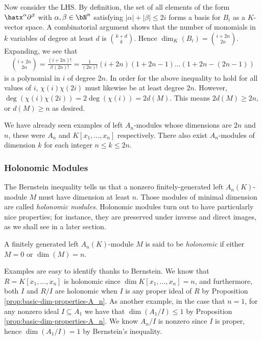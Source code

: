 \begin{prf}
	Now consider the LHS. By definition, the set of all elements of the form $\hatx^\alpha\partial^\beta$ with $\alpha, \beta \in \bN^n$ satisfying $|\alpha| + |\beta| \leq 2i$ forms a basis for $B_i$ as a $K$-vector space. A combinatorial argument shows that the number of monomials in $k$ variables of degree at least $d$ is $\binom{k+d}{k}$. Hence $\dim_K(B_i) = \binom{i+2n}{2n}$. Expanding, we see that
	\begin{align*}
		\binom{i+2n}{2n} = \frac{(i+2n)!}{i!(2n)!} = \frac{1}{(2n)!}(i+2n)(1 + 2n - 1)...(1+2n-(2n-1))
	\end{align*}
	is a polynomial in $i$ of degree $2n$. In order for the above inequality to hold for all values of $i$, $\chi(i)\chi(2i)$ must likewise be at least degree $2n$. However, $\deg(\chi(i)\chi(2i)) = 2\deg(\chi(i)) = 2d(M)$. This means $2d(M) \geq 2n$, or $d(M) \geq n$ as desired.
\end{prf}

We have already seen examples of left $A_n$-modules whose dimensions are $2n$ and $n$, these were $A_n$ and $K[x_1,...,x_n]$ respectively. There also exist $A_n$-modules of dimension $k$ for each integer $n\leq k\leq 2n$.
\begin{example}\label{example:dimension-each-possible-integer-example}
	
\end{example}

\subsubsection{Holonomic Modules}

The Bernstein inequality tells us that a nonzero finitely-generated left $A_n(K)$-module $M$ must have dimension at least $n$. Those modules of minimal dimension are called \emph{holonomic modules}. Holonomic modules turn out to have particularly nice properties; for instance, they are preserved under inverse and direct images, as we shall see in a later section.
\begin{defn}\label{defn:holonomic-modules}
	A finitely generated left $A_n(K)$-module $M$ is said to be \emph{holonomic} if either $M = 0$ or $\dim(M) = n$.
\end{defn}
Examples are easy to identify thanks to Bernstein. We know that $R = K[x_1,...,x_n]$ is holonomic since $\dim K[x_1,...,x_n] = n$, and furthermore, both $I$ and $R/I$ are holonomic when $I$ is any proper ideal of $R$ by Proposition \ref{prop:basic-dim-properties-A_n}. As another example, in the case that $n = 1$, for any nonzero ideal $I \subseteq A_1$ we have that $\dim(A_1/I) \leq 1$ by Proposition \ref{prop:basic-dim-properties-A_n}. We know $A_n/I$ is nonzero since $I$ is proper, hence $\dim(A_1/I) = 1$ by Bernstein's inequality.

